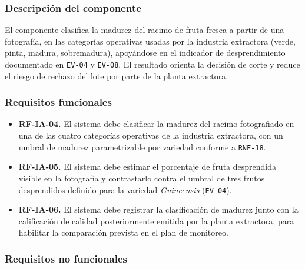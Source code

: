 \documentclass[11pt,a4paper]{article}
\newcommand{\id}[1]{\texttt{#1}}
\begin{document}
\subsubsection{Descripción del componente}

El componente clasifica la madurez del racimo de fruta fresca a partir de una fotografía, en las
categorías operativas usadas por la industria extractora (verde, pinta, madura, sobremadura),
apoyándose en el indicador de desprendimiento documentado en \id{EV-04} y \id{EV-08}. El resultado
orienta la decisión de corte y reduce el riesgo de rechazo del lote por parte de la planta
extractora.

\subsubsection{Requisitos funcionales}

\begin{itemize}[nosep]
  \item \textbf{RF-IA-04.} El sistema debe clasificar la madurez del racimo fotografiado en una de
        las cuatro categorías operativas de la industria extractora, con un umbral de madurez
        parametrizable por variedad conforme a \id{RNF-18}.
  \item \textbf{RF-IA-05.} El sistema debe estimar el porcentaje de fruta desprendida visible en la
        fotografía y contrastarlo contra el umbral de tres frutos desprendidos definido para la
        variedad \emph{Guineensis} (\id{EV-04}).
  \item \textbf{RF-IA-06.} El sistema debe registrar la clasificación de madurez junto con la
        calificación de calidad posteriormente emitida por la planta extractora, para habilitar la
        comparación prevista en el plan de monitoreo.
\end{itemize}

\subsubsection{Requisitos no funcionales}
\end{document}
